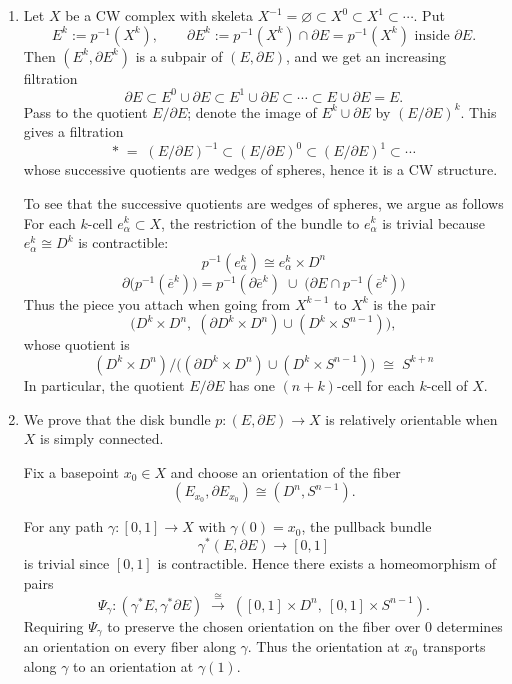 \documentclass[12pt]{article}  %
\begin{document}
\begin{solution}

    \begin{enumerate}
        \item Let $X$ be a CW complex with skeleta $X^{-1}=\varnothing\subset X^0\subset X^1\subset\cdots$. Put
        \[
        E^k:=p^{-1}(X^k),\qquad \partial E^k := p^{-1}(X^k)\cap \partial E=p^{-1}(X^k) \text{ inside }\partial E.
        \]
        Then $(E^k,\partial E^k)$ is a subpair of $(E,\partial E)$, and we get an increasing filtration
        \[
        \partial E \subset E^0\cup \partial E \subset E^1\cup \partial E\subset \cdots \subset E\cup \partial E = E.
        \]
        Pass to the quotient $E/\partial E$; denote the image of $E^k\cup \partial E$ by $(E/\partial E)^k$. This gives a filtration
        \[
        *\;=\;(E/\partial E)^{-1}\subset (E/\partial E)^0 \subset (E/\partial E)^1\subset \cdots
        \]
        whose successive quotients are wedges of spheres, hence it is a CW structure.

        To see that the successive quotients are wedges of spheres, we argue as follows
For each $k$-cell $e^k_\alpha\subset X$, the restriction of the bundle to $e^k_\alpha$ is trivial because $e^k_\alpha\cong D^k$ is contractible:
\[p^{-1}(e^k_\alpha)\cong e^k_\alpha\times D^n\]
        \[
       \partial\bigl(p^{-1}(\overline e^k)\bigr)
=
p^{-1}(\partial \overline e^k)
\;\cup\;
\bigl(\partial E \cap p^{-1}(\overline e^k)\bigr)
        \]
        Thus the piece you attach when going from $X^{k-1}$ to $X^k$ is the pair
        \[
        \bigl(D^k\times D^n,\; (\partial D^k\times D^n)\cup (D^k\times S^{n-1})\bigr),
        \]
        whose quotient is
        \[
        (D^k\times D^n)\big/ \bigl((\partial D^k\times D^n)\cup (D^k\times S^{n-1})\bigr)
        \;\cong\; S^{k+n}
        \]
        In particular, the quotient $E/\partial E$ has one $(n+k)$-cell for each $k$-cell of $X$.

\item We prove that the disk bundle $p:(E,\partial E)\to X$ is relatively orientable when $X$ is simply connected.

Fix a basepoint $x_0\in X$ and choose an orientation of the fiber
\[
(E_{x_0},\partial E_{x_0})\cong (D^n,S^{n-1}).
\]

For any path $\gamma:[0,1]\to X$ with $\gamma(0)=x_0$, the pullback bundle
\[
\gamma^*(E,\partial E)\to [0,1]
\]
is trivial since $[0,1]$ is contractible. Hence there exists a homeomorphism of pairs
\[
\Psi_\gamma:
(\gamma^*E,\gamma^*\partial E)
\;\xrightarrow{\cong}\;
([0,1]\times D^n,\ [0,1]\times S^{n-1}).
\]
Requiring $\Psi_\gamma$ to preserve the chosen orientation on the fiber over $0$
determines an orientation on every fiber along $\gamma$.
Thus the orientation at $x_0$ transports along $\gamma$ to an orientation at $\gamma(1)$.


\end{enumerate}
\end{solution}
\end{document}
